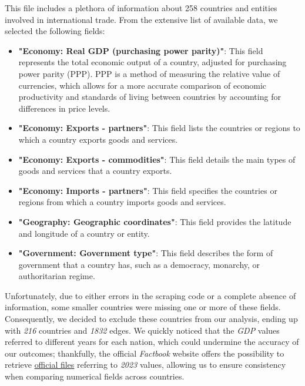 \documentclass[12pt, a4paper]{article}
\begin{document}
This file includes a plethora of information about 258 countries and entities involved in international trade. From the extensive list of available data, we selected the following fields:
\begin{itemize}
    \item \textbf{"Economy: Real GDP (purchasing power parity)"}: This field represents the total economic output of a country, adjusted for purchasing power parity (PPP). PPP is a method of measuring the relative value of currencies, which allows for a more accurate comparison of economic productivity and standards of living between countries by accounting for differences in price levels.

    \item \textbf{"Economy: Exports - partners"}: This field lists the countries or regions to which a country exports goods and services.

    \item \textbf{"Economy: Exports - commodities"}: This field details the main types of goods and services that a country exports.

    \item \textbf{"Economy: Imports - partners"}: This field specifies the countries or regions from which a country imports goods and services.

    \item \textbf{"Geography: Geographic coordinates"}: This field provides the latitude and longitude of a country or entity.

    \item \textbf{"Government: Government type"}: This field describes the form of government that a country has, such as a democracy, monarchy, or authoritarian regime.
    
\end{itemize}

Unfortunately, due to either errors in the scraping code or a complete absence of information, some smaller countries were missing one or more of these fields. Consequently, we decided to exclude these countries from our analysis, ending up with \textit{216} countries and \textit{1832} edges. We quickly noticed that the \textit{GDP} values referred to different years for each nation, which could undermine the accuracy of our outcomes; thankfully, the official \textit{Factbook} website offers the possibility to retrieve \href{https://www.cia.gov/the-world-factbook/references/guide-to-country-comparisons/}{official files} referring to \textit{2023} values, allowing us to ensure consistency when comparing numerical fields across countries.\\
\end{document}
